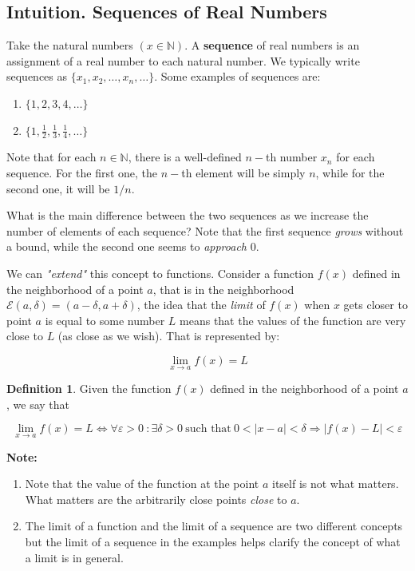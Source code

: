\documentclass[a4paper,11pt]{article}
\theoremstyle{definition}
\newtheorem{definition}{Definition}
\theoremstyle{plain}
\begin{document}
\subsection{Intuition. Sequences of Real
Numbers}\label{intuition.-sequences-of-real-numbers}

Take the natural numbers \((x\in\mathbb{N})\). A \textbf{sequence} of
real numbers is an assignment of a real number to each natural number.
We typically write sequences as \(\{x_1,x_2,\ldots,x_n,\ldots\}\). Some
examples of sequences are:

\begin{enumerate}
\def\labelenumi{\arabic{enumi}.}
\item
  \(\{1,2,3,4,\ldots\}\)
\item
  \(\{1,\frac{1}{2},\frac{1}{3},\frac{1}{4},\ldots\}\)
\end{enumerate}

Note that for each \(n\in\mathbb{N}\), there is a well-defined \(n-\)th
number \(x_n\) for each sequence. For the first one, the \(n-\)th
element will be simply \(n\), while for the second one, it will be
\(1/n\).

What is the main difference between the two sequences as we increase the
number of elements of each sequence? Note that the first sequence
\emph{grows} without a bound, while the second one seems to
\emph{approach} \(0\).

We can \emph{"extend"} this concept to functions. Consider a function
\(f(x)\) defined in the neighborhood of a point \(a\), that is in the
neighborhood \(\mathcal{E}(a,\delta) = (a-\delta,a + \delta)\), the idea
that the \emph{limit} of \(f(x)\) when \(x\) gets closer to point \(a\)
is equal to some number \(L\) means that the values of the function are
very close to \(L\) (as close as we wish). That is represented by:

\[
\lim_{x\rightarrow a} f(x) = L
\]

\begin{definition} 
Given the function \(f(x)\) defined in the
neighborhood of a point \(a\), we say that

\[
\lim_{x\rightarrow a} f(x) = L \iff \forall\varepsilon > 0 \ : \exists \delta > 0 \ \text{such that} \ 0<\lvert x-a\rvert < \delta \Rightarrow \lvert f(x) - L \rvert < \varepsilon
\]
\end{definition}

\textbf{Note:} 
\begin{enumerate}
	\item Note that the value of the function at the point \(a\)
itself is not what matters. What matters are the arbitrarily close
points \emph{close} to \(a\). 
	\item The limit of a function and the limit
of a sequence are two different concepts but the limit of a sequence in
the examples helps clarify the concept of what a limit is in general.
\end{enumerate}
\end{document}
